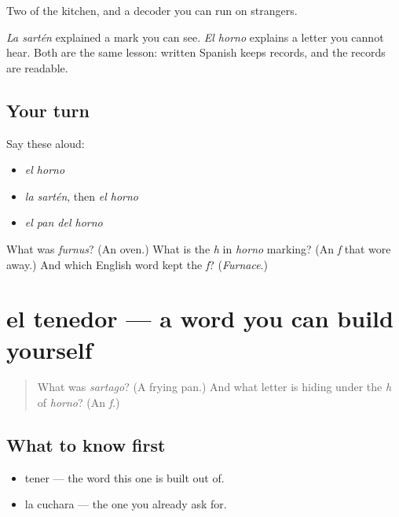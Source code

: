 \begin{grammarlens}[title={What you've built}]
Two of the kitchen, and a decoder you can run on strangers.

\emph{La sartén} explained a mark you can see. \emph{El horno} explains a letter you cannot hear. Both are the same lesson: written Spanish keeps records, and the records are readable.
\end{grammarlens}

\subsection*{Your turn}
Say these aloud:

\begin{itemize}
\raggedright
  \item \emph{el horno}
  \item \emph{la sartén}, then \emph{el horno}
  \item \emph{el pan del horno}
\end{itemize}

\begin{tcolorbox}[breakable,colback=teal!4,colframe=teal!35!black,title={Before you move on}]
What was \emph{furnus}? (An oven.) What is the \emph{h} in \emph{horno} marking? (An \emph{f} that wore away.) And which English word kept the \emph{f}? (\emph{Furnace}.)
\end{tcolorbox}
\section[el tenedor]{el tenedor — a word you can build yourself}

\label{lesson:ES-C297-tenedor}



\begin{quote}
What was \emph{sartago}? (A frying pan.) And what letter is hiding under the \emph{h} of \emph{horno}? (An \emph{f}.)
\end{quote}

\subsection*{What to know first}
\begin{itemize}
\raggedright
  \item tener — the word this one is built out of.
  \item la cuchara — the one you already ask for.
\end{itemize}

